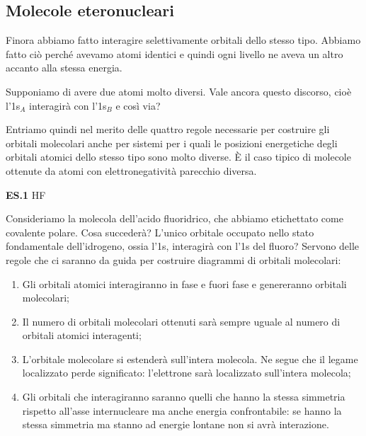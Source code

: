 \subsection{Molecole eteronucleari}
Finora abbiamo fatto interagire selettivamente orbitali dello stesso tipo. Abbiamo fatto ciò perché avevamo atomi identici e quindi ogni livello ne aveva un altro accanto alla stessa energia.

Supponiamo di avere due atomi molto diversi. Vale ancora questo discorso, cioè l'1s$_A$ interagirà con l'1s$_B$ e così via?

Entriamo quindi nel merito delle quattro regole necessarie per costruire gli orbitali molecolari anche per sistemi per i quali le posizioni energetiche degli orbitali atomici dello stesso tipo sono molto diverse. È il caso tipico di molecole ottenute da atomi con elettronegatività parecchio diversa.

\vspace{0.2cm}\textbf{ES.1} HF

Consideriamo la molecola dell'acido fluoridrico, che abbiamo etichettato come covalente polare. Cosa succederà? L'unico orbitale occupato nello stato fondamentale dell'idrogeno, ossia l'1s, interagirà con l'1s del fluoro? Servono delle regole che ci saranno da guida per costruire diagrammi di orbitali molecolari:

\begin{enumerate}
    \item Gli orbitali atomici interagiranno in fase e fuori fase e genereranno orbitali molecolari;
    \item Il numero di orbitali molecolari ottenuti sarà sempre uguale al numero di orbitali atomici interagenti;
    \item L'orbitale molecolare si estenderà sull'intera molecola. Ne segue che il legame localizzato perde significato: l'elettrone sarà localizzato sull'intera molecola;
    \item Gli orbitali che interagiranno saranno quelli che hanno la stessa simmetria rispetto all'asse internucleare ma anche energia confrontabile: se hanno la stessa simmetria ma stanno ad energie lontane non si avrà interazione.
\end{enumerate}

